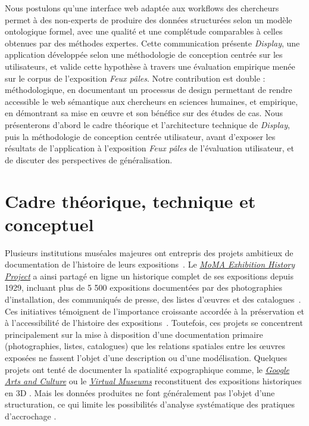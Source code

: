 \documentclass[fra, final]{anthology-ch}         %
\begin{document}
Nous postulons qu’une interface web adaptée aux workflows des chercheurs permet à des non-experts de produire des données structurées selon un modèle ontologique formel, avec une qualité et une complétude comparables à celles obtenues par des méthodes expertes. Cette communication présente \textit{Display}, une application développée selon une méthodologie de conception centrée sur les utilisateurs, et valide cette hypothèse à travers une évaluation empirique menée sur le corpus de l’exposition \textit{Feux pâles}. Notre contribution est double : méthodologique, en documentant un processus de design permettant de rendre accessible le web sémantique aux chercheurs en sciences humaines, et empirique, en démontrant sa mise en œuvre et son bénéfice sur des études de cas. Nous présenterons d’abord le cadre théorique et l’architecture technique de \textit{Display}, puis la méthodologie de conception centrée utilisateur, avant d’exposer les résultats de l’application à l’exposition \textit{Feux pâles} de l’évaluation utilisateur, et de discuter des perspectives de généralisation.

\section{Cadre théorique, technique et conceptuel}

Plusieurs institutions muséales majeures ont entrepris des projets ambitieux de documentation de l’histoire de leurs expositions~\cite{altshuler2013biennials}. Le \href{https://www.moma.org/research/archives/about-exhibition-history-project}{\textit{MoMA Exhibition History Project}} a ainsi partagé en ligne un historique complet de ses expositions depuis 1929, incluant plus de 5 500 expositions documentées par des photographies d’installation, des communiqués de presse, des listes d’œuvres et des catalogues~\cite{staniszewski1998power}. Ces initiatives témoignent de l’importance croissante accordée à la préservation et à l’accessibilité de l’histoire des expositions~\cite{greenberg2009remembering}. Toutefois, ces projets se concentrent principalement sur la mise à disposition d’une documentation primaire (photographies, listes, catalogues) que les relations spatiales entre les œuvres exposées ne fassent l’objet d’une description ou d’une modélisation. Quelques projets ont tenté de documenter la spatialité expographique comme, le \href{https://artsandculture.google.com/}{\textit{Google Arts and Culture}} ou le \href{https://www.virtualmuseums.world/#About}{\textit{Virtual Museums}} reconstituent des expositions historiques en 3D \cite{biella2009parameterizable, biella2010virtual, biella2010beyond}. Mais les données produites ne font généralement pas l’objet d’une structuration, ce qui limite les  possibilités d’analyse systématique des pratiques d’accrochage \cite{sacher2014metadata,sacher2014smart,sacher2017generative}.
\end{document}
